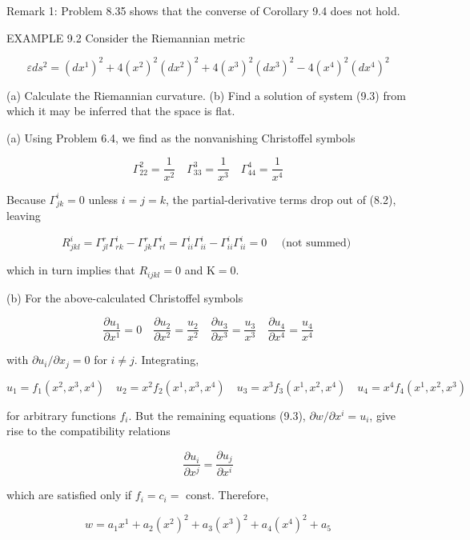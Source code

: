 \documentclass[10pt]{article}
\begin{document}
Remark 1: Problem 8.35 shows that the converse of Corollary 9.4 does not hold.

EXAMPLE 9.2 Consider the Riemannian metric

$$
\varepsilon d s^{2}=\left(d x^{1}\right)^{2}+4\left(x^{2}\right)^{2}\left(d x^{2}\right)^{2}+4\left(x^{3}\right)^{2}\left(d x^{3}\right)^{2}-4\left(x^{4}\right)^{2}\left(d x^{4}\right)^{2}
$$

(a) Calculate the Riemannian curvature. (b) Find a solution of system (9.3) from which it may be inferred that the space is flat.

(a) Using Problem 6.4, we find as the nonvanishing Christoffel symbols

$$
\Gamma_{22}^{2}=\frac{1}{x^{2}} \quad \Gamma_{33}^{3}=\frac{1}{x^{3}} \quad \Gamma_{44}^{4}=\frac{1}{x^{4}}
$$

Because $\Gamma_{j k}^{i}=0$ unless $i=j=k$, the partial-derivative terms drop out of (8.2), leaving

$$
R_{j k l}^{i}=\Gamma_{j l}^{r} \Gamma_{r k}^{i}-\Gamma_{j k}^{r} \Gamma_{r l}^{i}=\Gamma_{i i}^{i} \Gamma_{i i}^{i}-\Gamma_{i i}^{i} \Gamma_{i i}^{i}=0 \quad \text { (not summed) }
$$

which in turn implies that $R_{i j k l}=0$ and $\mathrm{K}=0$.

(b) For the above-calculated Christoffel symbols

$$
\frac{\partial u_{1}}{\partial x^{1}}=0 \quad \frac{\partial u_{2}}{\partial x^{2}}=\frac{u_{2}}{x^{2}} \quad \frac{\partial u_{3}}{\partial x^{3}}=\frac{u_{3}}{x^{3}} \quad \frac{\partial u_{4}}{\partial x^{4}}=\frac{u_{4}}{x^{4}}
$$

with $\partial u_{i} / \partial x_{j}=0$ for $i \neq j$. Integrating,

$$
u_{1}=f_{1}\left(x^{2}, x^{3}, x^{4}\right) \quad u_{2}=x^{2} f_{2}\left(x^{1}, x^{3}, x^{4}\right) \quad u_{3}=x^{3} f_{3}\left(x^{1}, x^{2}, x^{4}\right) \quad u_{4}=x^{4} f_{4}\left(x^{1}, x^{2}, x^{3}\right)
$$

for arbitrary functions $f_{i}$. But the remaining equations (9.3), $\partial w / \partial x^{i}=u_{i}$, give rise to the compatibility relations

$$
\frac{\partial u_{i}}{\partial x^{j}}=\frac{\partial u_{j}}{\partial x^{i}}
$$

which are satisfied only if $f_{i}=c_{i}=$ const. Therefore,

$$
w=a_{1} x^{1}+a_{2}\left(x^{2}\right)^{2}+a_{3}\left(x^{3}\right)^{2}+a_{4}\left(x^{4}\right)^{2}+a_{5}
$$
\end{document}

